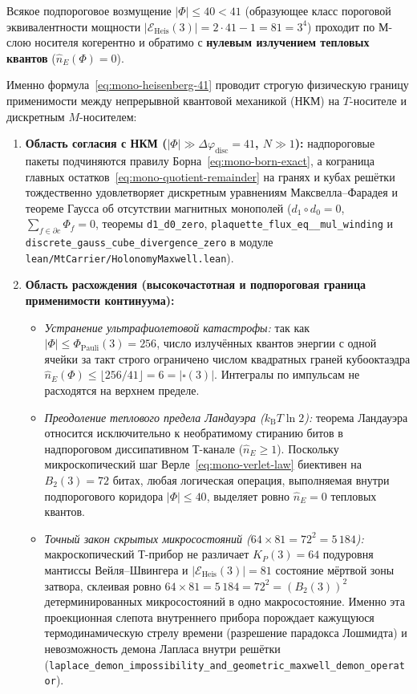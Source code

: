 Всякое подпороговое возмущение $|\Phi| \le 40 < 41$ (образующее класс пороговой эквивалентности мощности $|\mathcal{E}_{\mathrm{Heis}}(3)| = 2\cdot 41 - 1 = 81 = 3^4$) проходит по М-слою носителя когерентно и обратимо с \textbf{нулевым излучением тепловых квантов} ($\hat{n}_E(\Phi) = 0$).

Именно формула~\eqref{eq:mono-heisenberg-41} проводит строгую физическую границу применимости между непрерывной квантовой механикой (НКМ) на $T$-носителе и дискретным $M$-носителем:
\begin{enumerate}[leftmargin=*,noitemsep]
\item \textbf{Область согласия с НКМ ($|\Phi| \gg \Delta\varphi_{\mathrm{disc}} = 41$, $N \gg 1$):}
  надпороговые пакеты подчиняются правилу Борна~\eqref{eq:mono-born-exact}, а кограница главных остатков~\eqref{eq:mono-quotient-remainder} на гранях и кубах решётки тождественно удовлетворяет дискретным уравнениям Максвелла--Фарадея и теореме Гаусса об отсутствии магнитных монополей ($d_1 \circ d_0 = 0$, $\sum_{f \in \partial c} \Phi_f = 0$, теоремы \texttt{d1\_\allowbreak d0\_\allowbreak zero}, \texttt{plaquette\_\allowbreak flux\_\allowbreak eq\_\_\allowbreak mul\_\allowbreak winding} и \texttt{discrete\_\allowbreak gauss\_\allowbreak cube\_\allowbreak divergence\_\allowbreak zero} в модуле \texttt{lean/MtCarrier/\allowbreak HolonomyMaxwell.lean}).
\item \textbf{Область расхождения (высокочастотная и подпороговая граница применимости континуума):}
  \begin{itemize}[noitemsep]
  \item \emph{Устранение ультрафиолетовой катастрофы:} так как $|\Phi| \le \Phi_{\mathrm{Pauli}}(3) = 256$, число излучённых квантов энергии с одной ячейки за такт строго ограничено числом квадратных граней кубооктаэдра $\hat{n}_E(\Phi) \le \lfloor 256/41 \rfloor = 6 = |\square(3)|$. Интегралы по импульсам не расходятся на верхнем пределе.
  \item \emph{Преодоление теплового предела Ландауэра ($k_{\mathrm{B}}T \ln 2$):} теорема Ландауэра относится исключительно к необратимому стиранию битов в надпороговом диссипативном Т-канале ($\hat{n}_E \ge 1$). Поскольку микроскопический шаг Верле~\eqref{eq:mono-verlet-law} биективен на $B_2(3) = 72\text{ битах}$, любая логическая операция, выполняемая внутри подпорогового коридора $|\Phi| \le 40$, выделяет ровно $\hat{n}_E = 0$ тепловых квантов.
  \item \emph{Точный закон скрытых микросостояний ($64 \times 81 = 72^2 = 5\,184$):} макроскопический Т-прибор не различает $K_P(3) = 64$ подуровня мантиссы Вейля--Швингера и $|\mathcal{E}_{\mathrm{Heis}}(3)| = 81$ состояние мёртвой зоны затвора, склеивая ровно $64 \times 81 = 5\,184 = 72^2 = (B_2(3))^2$ детерминированных микросостояний в одно макросостояние. Именно эта проекционная слепота внутреннего прибора порождает кажущуюся термодинамическую стрелу времени (разрешение парадокса Лошмидта) и невозможность демона Лапласа внутри решётки (\texttt{laplace\_\allowbreak demon\_\allowbreak impossibility\_\allowbreak and\_\allowbreak geometric\_\allowbreak maxwell\_\allowbreak demon\_\allowbreak operator}).

\end{itemize}
\end{enumerate}
